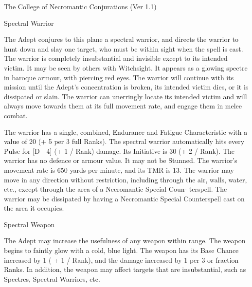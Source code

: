 \begin{Chapter}{The College of Necromantic Conjurations (Ver 1.1)}
\begin{spell}[S-12]{Spectral Warrior}

\begin{effects}
The Adept conjures to this plane a spectral warrior, and directs the
warrior to hunt down and slay one target, who must be within sight
when the spell is cast.  The warrior is completely insubstantial and
invisible except to its intended victim.  It may be seen by others
with Witchsight.  It appears as a glowing spectre in baroque armour,
with piercing red eyes.  The warrior will continue with its mission
until the Adept’s concentration is broken, its intended victim dies,
or it is dissipated or slain.  The warrior can unerringly locate its
intended victim and will always move towards them at its full movement
rate, and engage them in melee combat.

The warrior has a single, combined, Endurance and Fatigue
Characteristic with a value of 20 (+ 5 per 3 full Ranks).  The
spectral warrior automatically hits every Pulse for [D - 4] (+ 1 /
Rank) damage. Its Initiative is 30 (+ 2 / Rank). The warrior has no
defence or armour value. It may not be Stunned.  The warrior’s
movement rate is 650 yards per minute, and its TMR is 13.  The warrior
may move in any direction without restriction, including through the
air, walls, water, etc., except through the area of a Necromantic
Special Coun- terspell. The warrior may be dissipated by having a
Necromantic Special Counterspell cast on the area it occupies.
\end{effects}
\end{spell}

\begin{spell}[S-13]{Spectral Weapon}

\begin{effects}
The Adept may increase the usefulness of any weapon within range. The
weapon begins to faintly glow with a cold, blue light.  The weapon has
its Base Chance increased by 1 ( + 1 / Rank), and the damage increased
by 1 per 3 or fraction Ranks.  In addition, the weapon may affect
targets that are insubstantial, such as Spectres, Spectral Warriors,
etc.
\end{effects}
\end{spell}


\end{Chapter}
